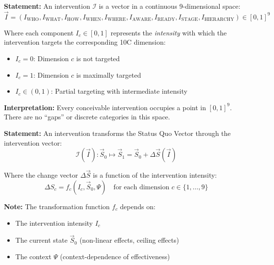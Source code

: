 \begin{tcolorbox}[colback=blue!5!white, colframe=blue!75!black,
    title=\textbf{Axiom EIT-1: The Continuous Intervention Space}]

\textbf{Statement:} An intervention $\mathcal{I}$ is a vector in a continuous 9-dimensional space:
\begin{equation}
\boxed{\vec{I} = (I_{\text{WHO}}, I_{\text{WHAT}}, I_{\text{HOW}}, I_{\text{WHEN}}, I_{\text{WHERE}}, I_{\text{AWARE}}, I_{\text{READY}}, I_{\text{STAGE}}, I_{\text{HIERARCHY}}) \in [0,1]^9}
\label{eq:hhh-continuous-space}
\end{equation}

Where each component $I_c \in [0,1]$ represents the \textit{intensity} with which the intervention targets the corresponding 10C dimension:
\begin{itemize}[nosep]
    \item $I_c = 0$: Dimension $c$ is not targeted
    \item $I_c = 1$: Dimension $c$ is maximally targeted
    \item $I_c \in (0,1)$: Partial targeting with intermediate intensity
\end{itemize}

\textbf{Interpretation:} Every conceivable intervention occupies a point in $[0,1]^9$. There are no ``gaps'' or discrete categories in this space.
\end{tcolorbox}

\begin{tcolorbox}[colback=blue!5!white, colframe=blue!75!black,
    title=\textbf{Axiom EIT-2: Intervention as 10C Transformation}]

\textbf{Statement:} An intervention transforms the Status Quo Vector through the intervention vector:
\begin{equation}
\boxed{\mathcal{I}(\vec{I}): \vec{S}_0 \mapsto \vec{S}_1 = \vec{S}_0 + \Delta\vec{S}(\vec{I})}
\label{eq:hhh-transformation}
\end{equation}

Where the change vector $\Delta\vec{S}$ is a function of the intervention intensity:
\begin{equation}
\Delta S_c = f_c(I_c, \vec{S}_0, \Psi) \quad \text{for each dimension } c \in \{1, \ldots, 9\}
\end{equation}

\textbf{Note:} The transformation function $f_c$ depends on:
\begin{itemize}[nosep]
    \item The intervention intensity $I_c$
    \item The current state $\vec{S}_0$ (non-linear effects, ceiling effects)
    \item The context $\Psi$ (context-dependence of effectiveness)
\end{itemize}
\end{tcolorbox}

